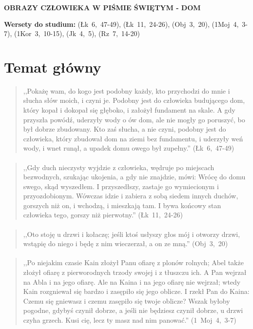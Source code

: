 \documentclass[10pt,a4paper,oneside]{article}
\begin{document}
\centerline{\textbf{\MakeUppercase{Obrazy człowieka w Piśmie Świętym - dom}}}
\begin{center}
\textbf{Wersety do studium:} 
\mbox{(Łk 6, 47-49)}, \mbox{(Łk 11, 24-26)}, \mbox{(Obj 3, 20)}, \mbox{(1Moj 4, 3-7)}, \mbox{(1Kor 3, 10-15)}, \mbox{(Jk 4, 5)}, \mbox{(Rz 7, 14-20)}
\end{center}
\section{Temat główny}
\paragraph{}
\begin{quote}
,,Pokażę wam, do kogo jest podobny każdy, kto przychodzi do mnie i słucha słów moich, i czyni je. Podobny jest do człowieka budującego dom, który kopał i dokopał się głęboko, i założył fundament na skale. A gdy przyszła powódź, uderzyły wody o ów dom, ale nie mogły go poruszyć, bo był dobrze zbudowany. Kto zaś słucha, a nie czyni, podobny jest do człowieka, który zbudował dom na ziemi bez fundamentu, i uderzyły weń wody, i wnet runął, a upadek domu owego był zupełny.'' \mbox{(Łk 6, 47-49)}
\end{quote}
\paragraph{}
\begin{quote}
,,Gdy duch nieczysty wyjdzie z człowieka, wędruje po miejscach bezwodnych, szukając ukojenia, a gdy nie znajdzie, mówi: Wrócę do domu swego, skąd wyszedłem. I przyszedłszy, zastaje go wymiecionym i przyozdobionym. Wówczas idzie i zabiera z sobą siedem innych duchów, gorszych niż on, i wchodzą, i mieszkają tam. I bywa końcowy stan człowieka tego, gorszy niż pierwotny.'' \mbox{(Łk 11, 24-26)}
\end{quote}
\paragraph{}
\begin{quote}
,,Oto stoję u drzwi i kołaczę; jeśli ktoś usłyszy głos mój i otworzy drzwi, wstąpię do niego i będę z nim wieczerzał, a on ze mną.'' \mbox{(Obj 3, 20)}
\end{quote}
\paragraph{}
\begin{quote}
,,Po niejakim czasie Kain złożył Panu ofiarę z plonów rolnych; Abel także złożył ofiarę z pierworodnych trzody swojej i z tłuszczu ich. A Pan wejrzał na Abla i na jego ofiarę. Ale na Kaina i na jego ofiarę nie wejrzał; wtedy Kain rozgniewał się bardzo i zasępiło się jego oblicze. I rzekł Pan do Kaina: Czemu się gniewasz i czemu zasępiło się twoje oblicze? Wszak byłoby pogodne, gdybyś czynił dobrze, a jeśli nie będziesz czynił dobrze, u drzwi czyha grzech. Kusi cię, lecz ty masz nad nim panować.'' \mbox{(1 Moj 4, 3-7)}
\end{quote}
\end{document}
